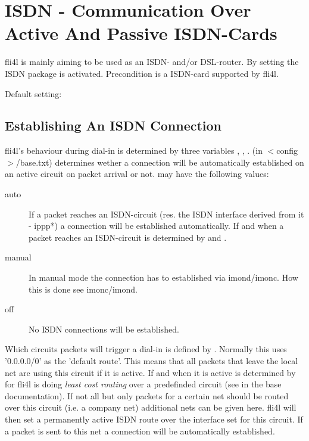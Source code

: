 \section {ISDN - Communication Over Active And Passive ISDN-Cards}

fli4l is mainly aiming to be used as an ISDN- and/or DSL-router. 
By setting  the ISDN package is activated. 
Precondition is a ISDN-card supported by fli4l.
    
Default setting: 


\subsection {Establishing An ISDN Connection}
\begin{sloppypar}
fli4l's behaviour during dial-in is determined by three variables
\mbox{,} ,
.  
(in $<$config$>$/base.txt) determines wether a connection will be 
automatically established on an active circuit on packet arrival 
or not.  may have the following values:
\end{sloppypar}

\begin{description}
\item[auto] If a packet reaches an ISDN-circuit (res. the ISDN 
  interface derived from it - ippp*) a connection will be established 
  automatically. If and when a packet reaches an ISDN-circuit is determined 
  by  and .
       
\item[manual] In manual mode the connection has to established via 
  imond/imonc. How this is done see imonc/imond.

 \item[off] No ISDN connections will be established.
\end{description}

Which circuits packets will trigger a dial-in is defined by 
. Normally this uses '0.0.0.0/0' as the 
'default route'. This means that all packets that leave the local net are 
using this circuit if it is active. If and when it is active is determined 
by  for fli4l is doing \emph{least cost routing} 
over a predefinded circuit (see  in the base documentation). If not all but only packets for 
a certain net should be routed over this circuit (i.e. a company net) additional 
nets can be given here. fli4l will then set a permanently active ISDN route over 
the interface set for this circuit. If a packet is sent to this net a connection 
will be automatically established.

